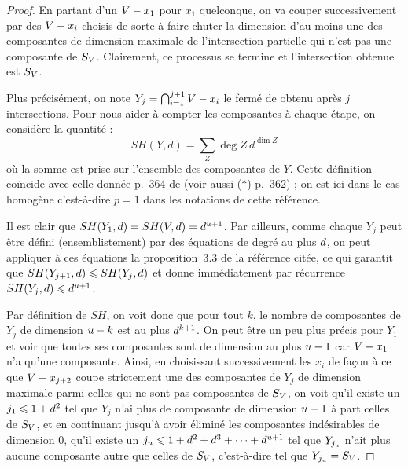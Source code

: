 \begin{proof}
  En partant d'un \( V - x_1 \) pour \( x_1 \) quelconque, on va couper
  successivement par des \( V - x_i \) choisis de sorte à faire chuter la
  dimension d'au moins une des composantes de dimension maximale de
  l'intersection partielle qui n'est pas une composante de \( S_V \).
  Clairement, ce processus se termine et l'intersection obtenue est \( S_V
  \).

  Plus précisément, on note \( Y_j = \bigcap_{i=1}^{j+1} V - x_i \) le
  fermé de  obtenu après \( j \) intersections.  Pour nous aider
  à compter les composantes à chaque étape, on considère la quantité :
  \begin{equation}
    SH(Y, d)
    =
    \sum_Z \deg Z \, d^{\dim Z}
  \end{equation}
  où la somme est prise sur l'ensemble des composantes de \( Y \). Cette
  définition coïncide avec celle donnée p.~364 de \cite{philz} (voir aussi
  ($*$) p.~362) ; on est ici dans le cas homogène c'est-à-dire \( p = 1 \)
  dans les notations de cette référence.

  Il est clair que \( SH(Y_1, d) = SH(V, d) = d^{u+1} \).
  Par ailleurs, comme chaque \( Y_j \) peut être défini (ensemblistement) par
  des équations de degré au plus \( d \), on peut appliquer à ces
  équations la proposition~3.3 de la référence citée, ce qui garantit que \(
    SH(Y_{j+1}, d) \leqslant SH(Y_j, d) \) et donne immédiatement par
  récurrence \( SH(Y_j, d) \leqslant d^{u+1} \).

  Par définition de \( SH \), on voit donc que pour tout \( k \), le nombre de
  composantes de \( Y_j \) de dimension \( u - k \) est au plus \(
    d^{k+1} \).  On peut être un peu plus précis pour \( Y_1 \) et voir
  que toutes ses composantes sont de dimension au plus \( u - 1 \) car \(
    V - x_1 \) n'a qu'une composante. Ainsi, en choisissant successivement
  les \( x_i \) de façon à ce que \( V - x_{j+2} \) coupe strictement une
  des composantes de \( Y_j \) de dimension maximale parmi celles qui ne sont
  pas composantes de \( S_V \), on voit qu'il existe un \( j_1 \leqslant 1 +
    d^2 \) tel que \( Y_j \) n'ai plus de composante de dimension \( u
    - 1 \) à part celles de \( S_V \), et en continuant jusqu'à avoir
  éliminé les composantes indésirables de dimension \( 0 \), qu'il existe un
  \( j_u \leqslant 1 + d^2 + d^3 + \dots + d^{u+1} \) tel que \(
    Y_{j_u} \) n'ait plus aucune composante autre que celles de \( S_V
  \), c'est-à-dire tel que \( Y_{j_u} = S_V \).


\end{proof}
